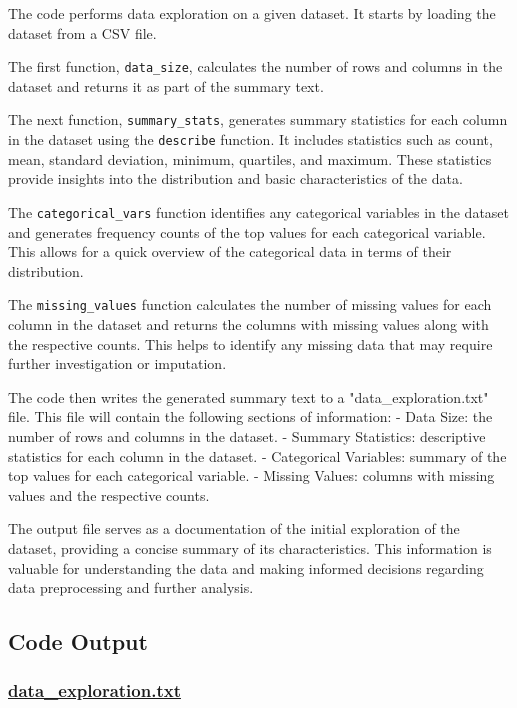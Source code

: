 \documentclass[11pt]{article}
\begin{document}
The code performs data exploration on a given dataset. It starts by loading the dataset from a CSV file.

The first function, \texttt{data\_size}, calculates the number of rows and columns in the dataset and returns it as part of the summary text.

The next function, \texttt{summary\_stats}, generates summary statistics for each column in the dataset using the \texttt{describe} function. It includes statistics such as count, mean, standard deviation, minimum, quartiles, and maximum. These statistics provide insights into the distribution and basic characteristics of the data.

The \texttt{categorical\_vars} function identifies any categorical variables in the dataset and generates frequency counts of the top values for each categorical variable. This allows for a quick overview of the categorical data in terms of their distribution.

The \texttt{missing\_values} function calculates the number of missing values for each column in the dataset and returns the columns with missing values along with the respective counts. This helps to identify any missing data that may require further investigation or imputation.

The code then writes the generated summary text to a "data\_exploration.txt" file. This file will contain the following sections of information:
- Data Size: the number of rows and columns in the dataset.
- Summary Statistics: descriptive statistics for each column in the dataset.
- Categorical Variables: summary of the top values for each categorical variable.
- Missing Values: columns with missing values and the respective counts.

The output file serves as a documentation of the initial exploration of the dataset, providing a concise summary of its characteristics. This information is valuable for understanding the data and making informed decisions regarding data preprocessing and further analysis.

\subsection{Code Output}\hypertarget{file-data-exploration-txt}{}

\subsubsection*{\hyperlink{code-Data Exploration-data-exploration-txt}{data\_exploration.txt}}
\end{document}
